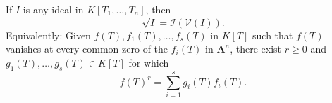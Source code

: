 If $I$ is any ideal in $K[T_1, \ldots, T_n]$, then
$$\sqrt{I} = \mathcal{I}(\mathcal{V}(I)).$$
Equivalently: Given $f(T), f_1(T), \ldots, f_s(T)$ in $K[T]$ such that $f(T)$ vanishes at every common zero of the $f_i(T)$ in $\mathbf{A}^n$, there exist $r \geqslant 0$ and $g_1(T), \ldots, g_s(T) \in K[T]$ for which
$$f(T)^r = \sum_{i=1}^{s} g_i(T) f_i(T).$$
